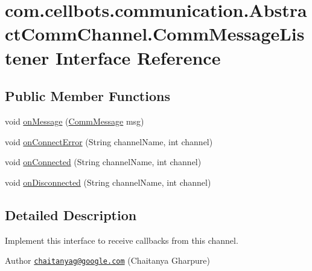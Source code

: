 \hypertarget{interfacecom_1_1cellbots_1_1communication_1_1_abstract_comm_channel_1_1_comm_message_listener}{\section{com.\-cellbots.\-communication.\-Abstract\-Comm\-Channel.\-Comm\-Message\-Listener Interface Reference}
\label{interfacecom_1_1cellbots_1_1communication_1_1_abstract_comm_channel_1_1_comm_message_listener}
}
\subsection*{Public Member Functions}
\begin{DoxyCompactItemize}
\item 
void \hyperlink{interfacecom_1_1cellbots_1_1communication_1_1_abstract_comm_channel_1_1_comm_message_listener_aec6333b51b689d99d873bd8911bf9444}{on\-Message} (\hyperlink{classcom_1_1cellbots_1_1communication_1_1_comm_message}{Comm\-Message} msg)
\item 
void \hyperlink{interfacecom_1_1cellbots_1_1communication_1_1_abstract_comm_channel_1_1_comm_message_listener_a7340e62e78c202b91817b2bd50b36f65}{on\-Connect\-Error} (String channel\-Name, int channel)
\item 
void \hyperlink{interfacecom_1_1cellbots_1_1communication_1_1_abstract_comm_channel_1_1_comm_message_listener_a86087238556317477833dba2469ab655}{on\-Connected} (String channel\-Name, int channel)
\item 
void \hyperlink{interfacecom_1_1cellbots_1_1communication_1_1_abstract_comm_channel_1_1_comm_message_listener_ae76d582cf3f4899e532b8be75d9c3802}{on\-Disconnected} (String channel\-Name, int channel)
\end{DoxyCompactItemize}


\subsection{Detailed Description}
Implement this interface to receive callbacks from this channel.

\begin{DoxyAuthor}{Author}
\href{mailto:chaitanyag@google.com}{\tt chaitanyag@google.\-com} (Chaitanya Gharpure) 
\end{DoxyAuthor}


